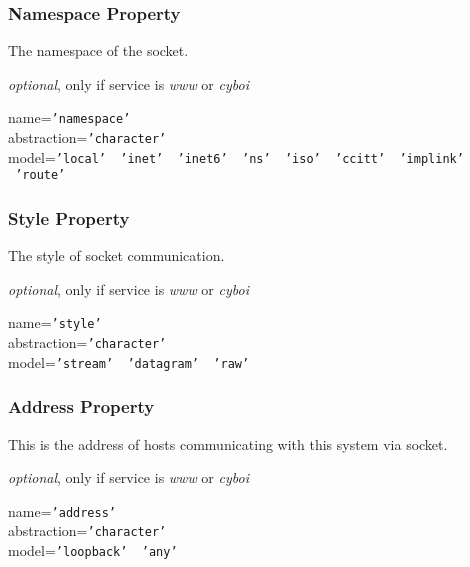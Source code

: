 \subsubsection{Namespace Property}

The namespace of the socket.

\emph{optional}, only if service is \emph{www} or \emph{cyboi}

name=\texttt{'namespace'}\\
abstraction=\texttt{'character'}\\
model=\texttt{'local' \vline\ 'inet' \vline\ 'inet6' \vline\ 'ns' \vline\ 'iso' \vline\ 'ccitt' \vline\ 'implink' \vline\ 'route'}

\subsubsection{Style Property}

The style of socket communication.

\emph{optional}, only if service is \emph{www} or \emph{cyboi}

name=\texttt{'style'}\\
abstraction=\texttt{'character'}\\
model=\texttt{'stream' \vline\ 'datagram' \vline\ 'raw'}

\subsubsection{Address Property}

This is the address of hosts communicating with this system via socket.

\emph{optional}, only if service is \emph{www} or \emph{cyboi}

name=\texttt{'address'}\\
abstraction=\texttt{'character'}\\
model=\texttt{'loopback' \vline\ 'any'}

